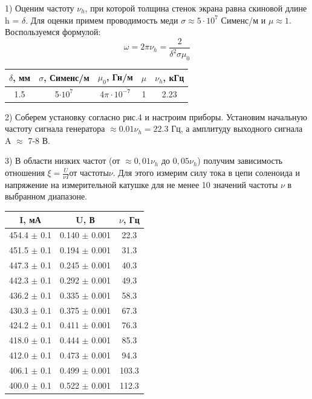 \documentclass[a4paper,12pt]{article}
\begin{document}
\par1) Оценим частоту $\nu_h$, при которой толщина стенок экрана равна скиновой длине h = $\delta$. Для оценки примем проводимость меди $\sigma \approx 5\cdot {10}^7$ Сименс/м и $\mu \approx 1$. Воспользуемся формулой:\\

$$ \omega = 2\pi {\nu}_h = \frac{2}{{\delta}^2 \sigma {\mu}_0}$$

\begin{center}
\begin{tabular}{|c|c|c|c|c|}
	\hline
	$\delta$, мм & $\sigma$, Сименс/м & $\mu_0$, Гн/м & $\mu$ & $\nu_h$, кГц\\  
	\hline
	1.5 & 5$\cdot {10}^7$ & 4$\pi\cdot {10}^{-7}$ & 1 & 2.23 \\
	\hline
\end{tabular}
\end{center}

\par2) Соберем установку согласно рис.4 и настроим приборы. Установим начальную частоту сигнала генератора $\approx 0.01 \nu_h = 22.3$ Гц, а амплитуду выходного сигнала A $\approx$ 7-8 В.

\par3) В области низких частот (от $\approx 0,01 \nu_h$ до $0,05 \nu_h$) получим зависимость отношения $\xi = \frac{U}{\nu I} \text{от частоты} \nu$. Для этого измерим силу тока в цепи соленоида и напряжение на измерительной катушке для не менее 10 значений частоты $\nu$ в выбранном диапазоне.\\

\begin{center}
\begin{tabular}{|c|c|c|}
	\hline
	I, мА & U, В & $\nu$, Гц \\
	\hline
	454.4 $\pm$ 0.1 & 0.140 $\pm$ 0.001 & 22.3 \\
	\hline
	451.5 $\pm$ 0.1 & 0.194 $\pm$ 0.001 & 31.3 \\
	\hline
	447.3 $\pm$ 0.1 & 0.245 $\pm$ 0.001 & 40.3 \\
	\hline
	442.3 $\pm$ 0.1 & 0.292 $\pm$ 0.001 & 49.3 \\
	\hline
	436.2 $\pm$ 0.1 & 0.335 $\pm$ 0.001 & 58.3 \\
	\hline
	430.3 $\pm$ 0.1 & 0.375 $\pm$ 0.001 & 67.3 \\
	\hline
	424.2 $\pm$ 0.1 & 0.411 $\pm$ 0.001 & 76.3 \\
	\hline
	418.0 $\pm$ 0.1 & 0.444 $\pm$ 0.001 & 85.3 \\
	\hline
	412.0 $\pm$ 0.1 & 0.473 $\pm$ 0.001 & 94.3 \\
	\hline 
	406.1 $\pm$ 0.1 & 0.499 $\pm$ 0.001 & 103.3 \\
	\hline 
	400.0 $\pm$ 0.1 & 0.522 $\pm$ 0.001 & 112.3 \\
	\hline
\end{tabular}
\end{center}
\end{document}
